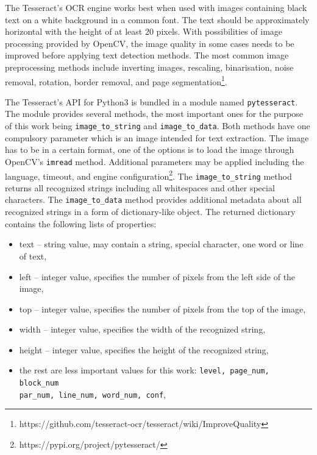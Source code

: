 The Tesseract's OCR engine works best when used with images containing black text on a white background in a common font. The text should be approximately horizontal with the height of at least 20 pixels. With possibilities of image processing provided by OpenCV, the image quality in some cases needs to be improved before applying text detection methods. The most common image preprocessing methods include inverting images, rescaling, binarisation, noise removal, rotation, border removal, and page segmentation\footnote{https://github.com/tesseract-ocr/tesseract/wiki/ImproveQuality}.

The Tesseract's API for Python3 is bundled in a module named \texttt{pytesseract}. The module provides several methods, the most important ones for the purpose of this work being \verb|image_to_string| and \verb|image_to_data|. Both methods have one compulsory parameter which is an image intended for text extraction. The image has to be in a certain format, one of the options is to load the image through OpenCV's \texttt{imread} method. Additional parameters may be applied including the language, timeout, and engine configuration\footnote{https://pypi.org/project/pytesseract/}. The \verb|image_to_string| method returns all recognized strings including all whitespaces and other special characters. The \verb|image_to_data| method provides additional metadata about all recognized strings in a form of dictionary-like object. The returned dictionary contains the following lists of properties:

\begin{itemize}
    \item text -- string value, may contain a string, special character, one word or line of text,
    \item left -- integer value, specifies the number of pixels from the left side of the image,
    \item top -- integer value, specifies the number of pixels from the top of the image,
    \item width -- integer value, specifies the width of the recognized string, 
    \item height -- integer value, specifies the height of the recognized string,
    \item the rest are less important values for this work: \verb|level, page_num, block_num| \\ \verb|par_num, line_num, word_num, conf|,
\end{itemize}


